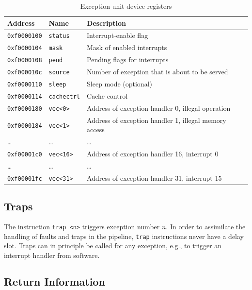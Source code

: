 \documentclass[a4paper,fontsize=10pt,twoside,DIV15,BCOR12mm,headinclude=true,footinclude=false,pagesize,bibtotoc]{scrbook}
\begin{document}
\begin{table}[b]
  \centering
  \begin{tabular}{llp{}}
    \toprule
    Address             & Name             & Description \\
    \midrule
    \texttt{0xf0000100} & \texttt{status} & Interrupt-enable flag \\
    \texttt{0xf0000104} & \texttt{mask} & Mask of enabled interrupts \\
    \texttt{0xf0000108} & \texttt{pend} & Pending flags for interrupts \\
    \texttt{0xf000010c} & \texttt{source} & Number of exception that
    is about to be served \\
    \texttt{0xf0000110} & \texttt{sleep} & Sleep mode (optional) \\
    \texttt{0xf0000114} & \texttt{cachectrl} & Cache control \\
    \cmidrule{1-3}
    \texttt{0xf0000180} & \texttt{vec<0>} & Address of exception handler 0, illegal operation \\
    \texttt{0xf0000184} & \texttt{vec<1>} & Address of exception handler 1, illegal memory access \\
    \dots & \dots & \dots \\
    \cmidrule{1-3}
    \texttt{0xf00001c0} & \texttt{vec<16>} & Address of exception handler 16, interrupt 0 \\
    \dots & \dots & \dots \\
    \texttt{0xf00001fc} & \texttt{vec<31>} & Address of exception handler 31, interrupt 15 \\
    \bottomrule
  \end{tabular}
  \caption{Exception unit device registers}
  \label{tab:excioregs}
\end{table}

\subsection{Traps}

The instruction \texttt{trap <n>} triggers exception number $n$. In
order to assimilate the handling of faults and traps in the pipeline,
\texttt{trap} instructions never have a delay slot. Traps can in
principle be called for any exception, e.g., to trigger an interrupt
handler from software.

\subsection{Return Information}
\end{document}
